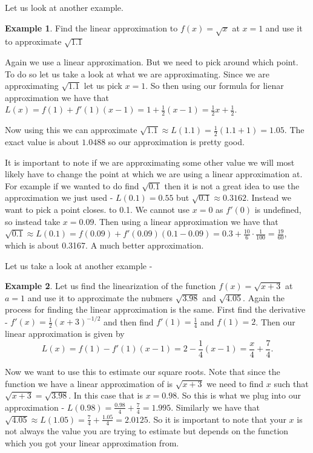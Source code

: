 \documentclass[12pt,reqno]{article}
\theoremstyle{definition}
\newtheorem*{Example}{Example}
\begin{document}
Let us look at another example. 
\begin{Example}
	Find the linear approximation to $f(x) = \sqrt{x}$ at $x = 1$ and use it to approximate $\sqrt{1.1}$
	
	Again we use a linear approximation. But we need to pick around which point. To do so let us take a look at what we are approximating. Since we are approximating $\sqrt{1.1}$ let us pick $x = 1$. So then using our formula for lienar approximation we have that $L(x) = f(1) + f'(1) (x - 1) = 1 + \frac{1}{2} (x - 1) = \frac{1}{2} x + \frac{1}{2}$. 
	
	Now using this we can approximate $\sqrt{1.1} \approx L(1.1) = \frac{1}{2} (1.1 + 1) = 1.05$. The exact value is about $1.0488$ so our approximation is pretty good. 


	It is important to note if we are approximating some other value we will most likely have to change the point at which we are using a linear approximation at. For example if we wanted to do find $\sqrt{0.1}$ then it is not a great idea to use the approximation we just used - $L(0.1) = 0.55$ but $\sqrt{0.1}\approx 0.3162$. Instead we want to pick a point closes. to 0.1. We cannot use $x= 0$ as $f'(0)$ is undefined, so instead take $x = 0.09$. Then using a linear approximation we have that $\sqrt{0. 1} \approx L(0.1) = f(0.09) + f'(0.09)(0.1 - 0.09) = 0.3 + \frac{10}{6} \cdot \frac{1}{100} = \frac{19}{60}$, which is about 0.3167. A much better approximation. 
\end{Example}

Let us take a look at another example - 
\begin{Example}
Let us find the linearization of the function $f(x) = \sqrt{x + 3}$ at $a = 1$ and use it to approximate the nubmers $\sqrt{3.98}$ and $\sqrt{4.05}$. Again the process for finding the linear approximation is the same. First find the derivative - $f'(x) = \frac{1}{2} (x + 3)^{-1/2}$ and then find $f'(1) = \frac{1}{4}$ and $f(1) = 2$. Then our linear approximation is given by $$L(x) = f(1) - f'(1) (x - 1) = 2 - \frac{1}{4}(x - 1) = \frac{x}{4} + \frac{7}{4}.$$

	Now we want to use this to estimate our square roots. Note that since the function we have a linear approximation of is $\sqrt{x + 3}$ we need to find $x$ such that $\sqrt{x + 3} = \sqrt{3.98}$. In this case that is $x = 0.98$. So this is what we plug into our approximation - $L(0. 98) = \frac{0.98}{4} + \frac{7}{4} = 1.995$. Similarly we have that $\sqrt{4.05} \approx L(1.05) = \frac{7}{4} + \frac{1.05}{4} = 2.0125.$ So it is important to note that your $x$ is not always the value you are trying to estimate but depends on the function which you got your linear approximation from. 
\end{Example}
\end{document}
